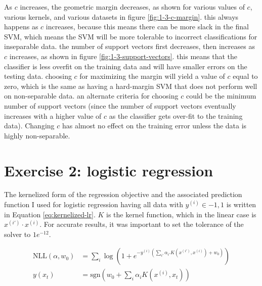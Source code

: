 \documentclass[10pt]{article}
\begin{document}
As $c$ increases, the geometric margin decreases, as shown for various values of $c$, various kernels, and various datasets in figure \ref{fig:1-3-c-margin}. this always happens as $c$ increases, because this means there can be more slack in the final SVM, which means the SVM will be more tolerable to incorrect classifications for inseparable data. the number of support vectors first decreases, then increases as $c$ increases, as shown in figure \ref{fig:1-3-support-vectors}. this means that the classifier is less overfit on the training data and will have smaller errors on the testing data. choosing $c$ for maximizing the margin will yield a value of $c$ equal to zero, which is the same as having a hard-margin SVM that does not perform well on non-separable data. an alternate criteria for choosing $c$ could be the minimum number of support vectors (since the number of support vectors eventually increases with a higher value of $c$ as the classifier gets over-fit to the training data). Changing $c$ has almost no effect on the training error unless the data is highly non-separable.

\section{Exercise 2: logistic regression}

The kernelized form of the regression objective and the associated prediction function I used for logistic regression having all data with $y^{(i)} \in {-1, 1}$ is written in Equation \ref{eq:kernelized-lr}. $K$ is the kernel function, which in the linear case is $x^{(i')} \cdot x^{(i)}$. For accurate results, it was important to set the tolerance of the solver to $1e^{-12}$.

\begin{subequations}
	\begin{align}
		\text{NLL}(\alpha, w_0) &= \sum_i \log \left(1 + e^{-y^{(i)}\left(\displaystyle\sum_{i'} \alpha_{i'} K(x^{(i')}, x^{(i)}) + w_0\right)}\right) \\
		y(x_t) &= \text{sgn}\left(w_0 + \sum_i \alpha_i K(x^{(i)}, x_t)\right)
	\end{align}
	\label{eq:kernelized-lr}
\end{subequations}

\end{document}
